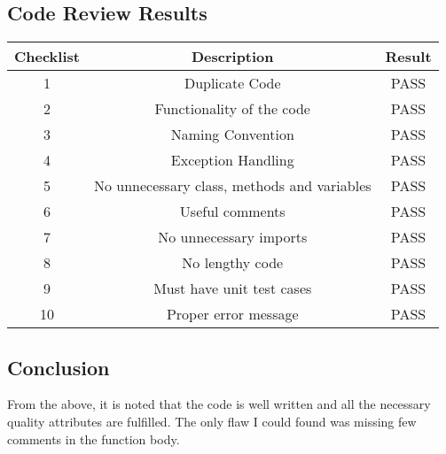 \documentclass[a4paper,12pt]{article}
\begin{document}
    \subsection{Code Review Results}
    \begin{center}
    \begin{tabular}{||c c c||} 
     \hline
     Checklist & Description & Result \\ 
     \hline\hline
     1 & Duplicate Code & PASS \\ 
     \hline
     2 & Functionality of the code & PASS \\
     \hline
     3 & Naming Convention & PASS \\
     \hline
     4 & Exception Handling & PASS \\
     \hline
     5 & No unnecessary class, methods and variables & PASS \\ 
     \hline
     6 & Useful comments & PASS \\
     \hline
     7 & No unnecessary imports & PASS \\
     \hline
     8 & No lengthy code & PASS \\
     \hline
     9 & Must have unit test cases & PASS \\
     \hline
     10 & Proper error message & PASS \\
     \hline
    \end{tabular}
    \end{center}
    
    \subsection{Conclusion}
    From the above, it is noted that the code is well written and all the necessary quality attributes are fulfilled. The only flaw I could found was missing few comments in the function body.
\end{document}
